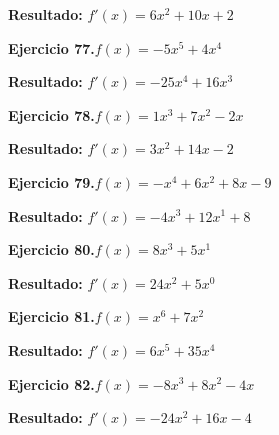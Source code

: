 \documentclass[10pt,a4paper]{article}
\begin{document}
\begin{solbox}
\textbf{Resultado:} \(\displaystyle f'(x) = 6x^2 +10x +2\)
\end{solbox}

\begin{ejbox}
\textbf{Ejercicio 77.}\quad $f(x) = -5x^{5} +4x^{4}$
\end{ejbox}

\begin{solbox}
\textbf{Resultado:} \(\displaystyle f'(x) = -25x^{4} +16x^{3}\)
\end{solbox}

\begin{ejbox}
\textbf{Ejercicio 78.}\quad $f(x) = 1x^{3} +7x^2 -2x$
\end{ejbox}

\begin{solbox}
\textbf{Resultado:} \(\displaystyle f'(x) = 3x^{2} +14x -2\)
\end{solbox}

\newpage
\begin{ejbox}
\textbf{Ejercicio 79.}\quad $f(x) = -x^{4} +6x^{2} +8x -9$
\end{ejbox}

\begin{solbox}
\textbf{Resultado:} \(\displaystyle f'(x) = -4x^{3} +12x^{1} +8\)
\end{solbox}

\begin{ejbox}
\textbf{Ejercicio 80.}\quad $f(x) = 8x^{3} +5x^{1}$
\end{ejbox}

\begin{solbox}
\textbf{Resultado:} \(\displaystyle f'(x) = 24x^{2} +5x^{0}\)
\end{solbox}

\begin{ejbox}
\textbf{Ejercicio 81.}\quad $f(x) = x^{6} + 7x^{2}$
\end{ejbox}

\begin{solbox}
\textbf{Resultado:} \(\displaystyle f'(x) = 6x^{5} + 35x^{4}\)
\end{solbox}

\newpage
\begin{ejbox}
\textbf{Ejercicio 82.}\quad $f(x) = -8x^3 +8x^2 -4x$
\end{ejbox}

\begin{solbox}
\textbf{Resultado:} \(\displaystyle f'(x) = -24x^2 +16x -4\)
\end{solbox}
\end{document}
